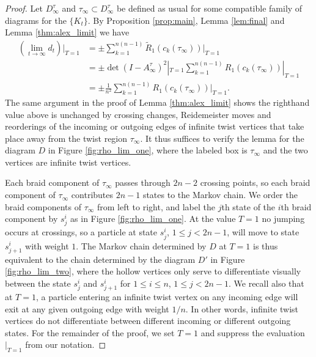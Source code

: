 \documentclass[11pt,hyp,]{nyjm}
\numberwithin{thm}{section}
\theoremstyle{definition}
\theoremstyle{remark}
\begin{document}
	\begin{proof}
		Let $D^\tau_\infty$ and $\tau_\infty \subset D^\tau_\infty$ be defined as usual for some compatible family of diagrams for the $\{K_t\}$. By Proposition \ref{prop:main}, Lemma \ref{lem:final} and Lemma \ref{thm:alex_limit} we have
		\begin{align}
			\label{eq:okay}
			(\lim_{t \to \infty} d_t) |_{T = 1} &= \pm \sum_{k = 1}^{n(n - 1)} \widetilde{R}_1(c_k(\tau_\infty))|_{T = 1} \\ \nonumber
			&= \pm \det(I - A^\tau_\infty)^2|_{T = 1} \sum_{k = 1}^{n(n - 1)} R_1(c_k(\tau_\infty))|_{T = 1} \\ \nonumber
			&= \pm \frac{1}{n^2} \sum_{k = 1}^{n(n - 1)} R_1(c_k(\tau_\infty))|_{T = 1}.
		\end{align}
		The same argument in the proof of Lemma \ref{thm:alex_limit} shows the righthand value above is unchanged by crossing changes, Reidemeister moves and reorderings of the incoming or outgoing edges of infinite twist vertices that take place away from the twist region $\tau_\infty$. It thus suffices to verify the lemma for the diagram $D$ in Figure \ref{fig:rho_lim_one}, where the labeled box is $\tau_\infty$ and the two vertices are infinite twist vertices. 
		
		Each braid component of $\tau_\infty$ passes through $2n - 2$ crossing points, so each braid component of $\tau_\infty$ contributes $2n - 1$ states to the Markov chain. We order the braid components of $\tau_\infty$ from left to right, and label the $j$th state of the $i$th braid component by $s^i_j$ as in Figure \ref{fig:rho_lim_one}. At the value $T = 1$ no jumping occurs at crossings, so a particle at state $s^i_j$, $1 \leq j < 2n - 1$, will move to state $s^i_{j + 1}$ with weight $1$. The Markov chain determined by $D$ at $T = 1$ is thus equivalent to the chain determined by the diagram $D'$ in Figure \ref{fig:rho_lim_two}, where the hollow vertices only serve to differentiate visually between the state $s^i_j$ and $s^i_{j + 1}$ for $1 \leq i \leq n$, $1 \leq j < 2n - 1$. We recall also that at $T = 1$, a particle entering an infinite twist vertex on any incoming edge will exit at any given outgoing edge with weight $1/n$. In other words, infinite twist vertices do not differentiate between different incoming or different outgoing states. For the remainder of the proof, we set $T = 1$ and suppress the evaluation $|_{T = 1}$ from our notation.
		

\end{proof}
\end{document}
